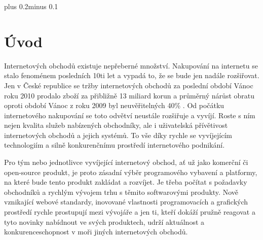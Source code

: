 \documentclass[11pt,twoside,a4paper]{book}
\begin{document}

\tableofcontents



\listoffigures



\listoftables



\mainbodystarts
\normalfont
{}\baselineskip plus 0.2\baselineskip minus 0.1\baselineskip



% 
% 


\chapter{Úvod}
Internetových obchodů existuje nepřeberné množství. Nakupování na internetu se stalo fenoménem posledních 10ti let a vypadá to, že se bude jen nadále rozšiřovat. Jen v České republice se tržby internetových obchodů za poslední období Vánoc roku 2010 prodalo zboží za přibližně 13 miliard korun a průměrný nárůst obratu oproti období Vánoc z roku 2009 byl neuvěřitelných 40\% \cite{vanocenainternetu}. Od počátku internetového nakupování se toto odvětví neustále rozšiřuje a vyvíjí. Roste s ním nejen kvalita služeb nabízených obchodníky, ale i uživatelská přívětivost internetových obchodů a jejich systémů. To vše díky rychle se vyvíjejícím technologiím a silně konkurenčnímu prostředí internetového podnikání.

Pro tým nebo jednotlivce vyvíjející internetový obchod, ať už jako komerční či open-source produkt, je proto zásadní výběr programového vybavení a platformy, na které bude tento produkt zakládat a rozvíjet. Je třeba počítat s požadavky obchodníků a rychlým vývojem trhu s těmito softwarovými produkty. Nově vznikající webové standardy, inovované vlastnosti programovacích a grafických prostředí rychle prostupují mezi vývojáře a jen ti, kteří dokáží pružně reagovat a tyto novinky nabídnout ve svých produktech, udrží aktuálnost a konkurenceschopnost v moři jiných internetových obchodů.
\end{document}
